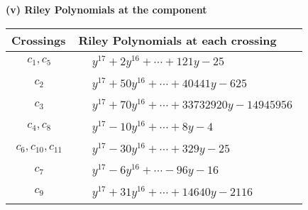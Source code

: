 \documentclass[1p]{elsarticle_modified}
\theoremstyle{definition}
\begin{document}
\newpage\renewcommand{\arraystretch}{1}
\flushleft \textbf{(v) Riley Polynomials at the component}\newline \\
\begin{tabular}{m{50pt}|m{274pt}}
Crossings & \hspace{64pt}Riley Polynomials at each crossing \\
\hline $$\begin{aligned}c_{1},c_{5}\end{aligned}$$&$\begin{aligned}
&y^{17}+2 y^{16}+\cdots+121 y-25
\end{aligned}$\\
\hline $$\begin{aligned}c_{2}\end{aligned}$$&$\begin{aligned}
&y^{17}+50 y^{16}+\cdots+40441 y-625
\end{aligned}$\\
\hline $$\begin{aligned}c_{3}\end{aligned}$$&$\begin{aligned}
&y^{17}+70 y^{16}+\cdots+33732920 y-14945956
\end{aligned}$\\
\hline $$\begin{aligned}c_{4},c_{8}\end{aligned}$$&$\begin{aligned}
&y^{17}-10 y^{16}+\cdots+8 y-4
\end{aligned}$\\
\hline $$\begin{aligned}c_{6},c_{10},c_{11}\end{aligned}$$&$\begin{aligned}
&y^{17}-30 y^{16}+\cdots+329 y-25
\end{aligned}$\\
\hline $$\begin{aligned}c_{7}\end{aligned}$$&$\begin{aligned}
&y^{17}-6 y^{16}+\cdots-96 y-16
\end{aligned}$\\
\hline $$\begin{aligned}c_{9}\end{aligned}$$&$\begin{aligned}
&y^{17}+31 y^{16}+\cdots+14640 y-2116
\end{aligned}$\\
\hline
\end{tabular}\\~\\
\end{document}
